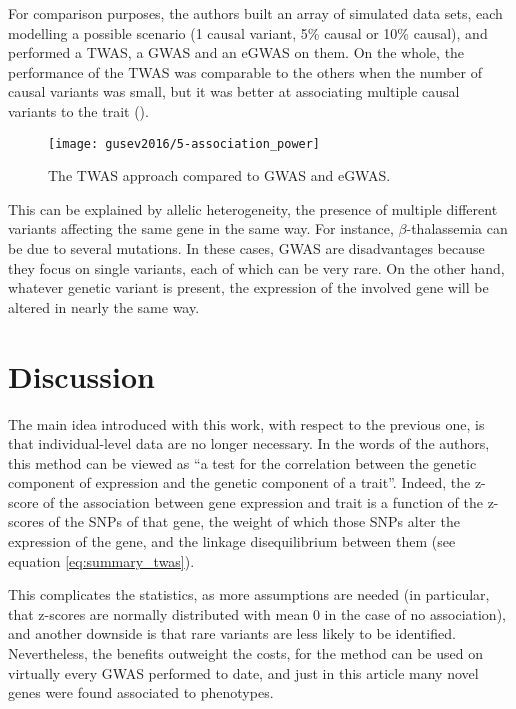 \documentclass[../main.tex]{subfiles}
\begin{document}
For comparison purposes, the authors built an array of simulated data 
sets, each modelling a possible scenario (1 causal variant, 5\% causal 
or 10\% causal), and performed a TWAS, a GWAS and an eGWAS on them. On the whole, the performance of the TWAS was 
comparable to the others when the number of causal variants was small, 
but it was better at associating multiple causal variants to the trait 
().

\begin{figure}
	\centering
	\texttt{[image: gusev2016/5-association\_power]}
	\caption{The TWAS approach compared to GWAS and eGWAS.}
\end{figure}

This can be explained by allelic heterogeneity, \ie the presence of 
multiple different variants affecting the same gene in the same way. For 
instance, $\beta$-thalassemia can be due to several mutations. In these 
cases, GWAS are disadvantages because they focus on single variants, 
each of which can be very rare. On the other hand, whatever genetic 
variant is present, the expression of the involved gene will be altered 
in nearly the same way.

\section{Discussion}

The main idea introduced with this work, with respect to the previous 
one, is that individual-level data are no longer necessary. In the words 
of the authors, this method can be viewed as \enquote{a test for the 
correlation between the genetic component of expression and the genetic 
component of a trait}. Indeed, the z-score of the association between 
gene expression and trait is a function of the z-scores of the \cis SNPs 
of that gene, the weight of which those SNPs alter the expression of the 
gene, and the linkage disequilibrium between them (see equation 
\eqref{eq:summary_twas}).

This complicates the statistics, as more assumptions are needed (in 
particular, that z-scores are normally distributed with mean $0$ in the 
case of no association), and another downside is that rare variants are 
less likely to be identified. Nevertheless, the benefits outweight the 
costs, for the method can be used on virtually every GWAS performed to 
date, and just in this article many novel genes were found associated to 
phenotypes.
\end{document}
